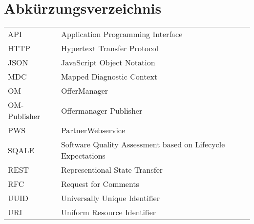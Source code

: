 \section{Abkürzungsverzeichnis}

\begin{tabular}{ll}
API             & Application Programming Interface \\
HTTP            & Hypertext Transfer Protocol \\
JSON            & JavaScript Object Notation \\
MDC             & Mapped Diagnostic Context \\
OM              & OfferManager \\
OM-Publisher    & Offermanager-Publisher \\
PWS             & PartnerWebservice \\
SQALE           & Software Quality Assessment based on Lifecycle Expectations\\
REST            & Representional State Transfer \\
RFC             & Request for Comments \\
UUID            & Universally Unique Identifier \\
URI             & Uniform Resource Identifier \\ 
\end{tabular}


